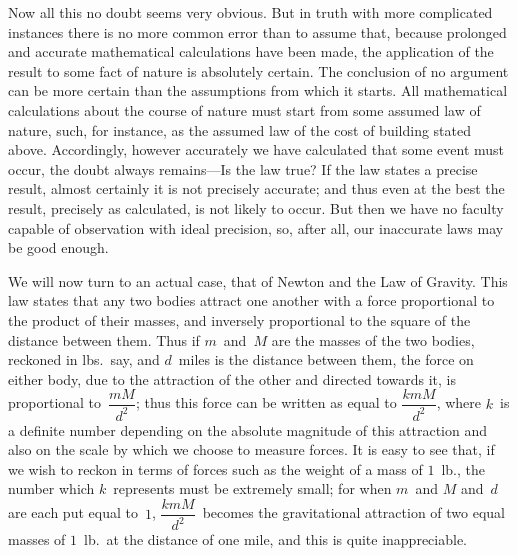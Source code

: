 \documentclass[12pt,leqno]{book}[2005/09/16]
\newcommand{\PageSep}[1]{\ignorespaces}
\begin{document}
Now all this no doubt seems very obvious.
But in truth with more complicated instances
there is no more common error than to assume
that, because prolonged and accurate mathematical
calculations have been made, the
application of the result to some fact of
nature is absolutely certain. The conclusion
of no argument can be more certain than the
assumptions from which it starts. All mathematical
calculations about the course of
\PageSep{28}
nature must start from some assumed law of
nature, such, for instance, as the assumed
law of the cost of building stated above.
Accordingly, however accurately we have
calculated that some event must occur, the
doubt always remains---Is the law true? If
the law states a precise result, almost certainly
it is not precisely accurate; and thus
even at the best the result, precisely as calculated,
is not likely to occur. But then we
have no faculty capable of observation with
ideal precision, so, after all, our inaccurate
laws may be good enough.

We will now turn to an actual case, that
of Newton and the Law of Gravity. This law
states that any two bodies attract one another
with a force proportional to the product
of their masses, and inversely proportional to
the square of the distance between them.
Thus if $m$~and~$M$ are the masses of the two
bodies, reckoned in lbs.\ say, and $d$~miles is
the distance between them, the force on either
body, due to the attraction of the other and
directed towards it, is proportional to~$\dfrac{mM}{d^{2}}$;
thus this force can be written as equal to
$\dfrac{kmM}{d^{2}}$, where $k$~is a definite number depending
on the absolute magnitude of this attraction
and also on the scale by which we choose to
measure forces. It is easy to see that, if we
\PageSep{29}
wish to reckon in terms of forces such as the
weight of a mass of $1$~lb., the number which
$k$~represents must be extremely small; for
when $m$~and $M$ and~$d$ are each put equal to~$1$,
$\dfrac{kmM}{d^{2}}$~becomes the gravitational attraction
of two equal masses of $1$~lb.\ at the distance of
one mile, and this is quite inappreciable.
\end{document}
